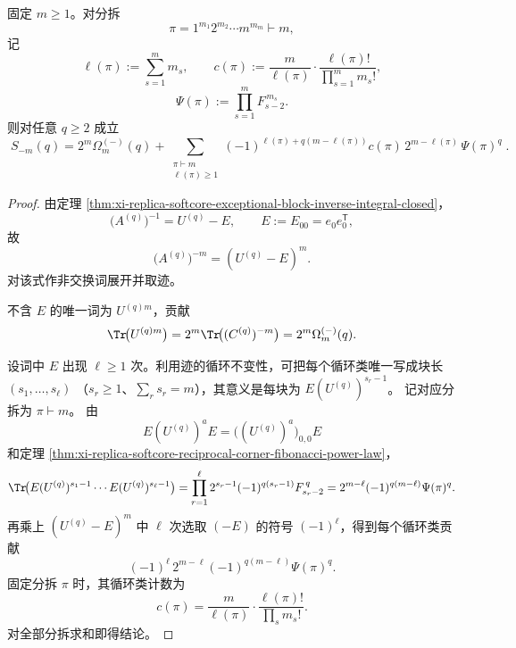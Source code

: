 \begin{theorem}\label{thm:xi-replica-softcore-reciprocal-moment-partition-closed-form}
固定 \(m\ge1\)。对分拆
\[
\pi=1^{m_1}2^{m_2}\cdots m^{m_m}\vdash m,
\]
记
\[
\ell(\pi):=\sum_{s=1}^{m}m_s,\qquad
c(\pi):=\frac{m}{\ell(\pi)}\cdot\frac{\ell(\pi)!}{\prod_{s=1}^{m}m_s!},
\]
\[
\Psi(\pi):=\prod_{s=1}^{m}F_{s-2}^{\,m_s}.
\]
则对任意 \(q\ge2\) 成立
\[
\boxed{\;
S_{-m}(q)
=2^m\Omega_m^{(-)}(q)
+\sum_{\substack{\pi\vdash m\\ \ell(\pi)\ge1}}
(-1)^{\ell(\pi)+q(m-\ell(\pi))}
c(\pi)\,2^{m-\ell(\pi)}\,\Psi(\pi)^q\; }.
\]
\end{theorem}
\begin{proof}
由定理 \ref{thm:xi-replica-softcore-exceptional-block-inverse-integral-closed}，
\[
\bigl(A^{(q)}\bigr)^{-1}=U^{(q)}-E,\qquad E:=E_{00}=e_0e_0^{\mathsf T},
\]
故
\[
\bigl(A^{(q)}\bigr)^{-m}=(U^{(q)}-E)^m.
\]
对该式作非交换词展开并取迹。

不含 \(E\) 的唯一词为 \(U^{(q)m}\)，贡献
\[
\Tr\!\bigl(U^{(q)m}\bigr)
=2^m\Tr\!\bigl((C^{(q)})^{-m}\bigr)
=2^m\Omega_m^{(-)}(q).
\]

设词中 \(E\) 出现 \(\ell\ge1\) 次。利用迹的循环不变性，可把每个循环类唯一写成块长
\(
(s_1,\dots,s_\ell)
\)
（\(s_r\ge1\)、\(\sum_r s_r=m\)），其意义是每块为 \(E(U^{(q)})^{s_r-1}\)。
记对应分拆为 \(\pi\vdash m\)。
由
\[
E(U^{(q)})^aE=\bigl((U^{(q)})^a\bigr)_{0,0}E
\]
和定理 \ref{thm:xi-replica-softcore-reciprocal-corner-fibonacci-power-law}，
\[
\Tr\!\bigl(E(U^{(q)})^{s_1-1}\cdots E(U^{(q)})^{s_\ell-1}\bigr)
=\prod_{r=1}^{\ell}2^{s_r-1}(-1)^{q(s_r-1)}F_{s_r-2}^{\,q}
=2^{m-\ell}(-1)^{q(m-\ell)}\Psi(\pi)^q.
\]
再乘上 \((U^{(q)}-E)^m\) 中 \(\ell\) 次选取 \((-E)\) 的符号 \((-1)^\ell\)，得到每个循环类贡献
\[
(-1)^\ell\,2^{m-\ell}(-1)^{q(m-\ell)}\Psi(\pi)^q.
\]
固定分拆 \(\pi\) 时，其循环类计数为
\[
c(\pi)=\frac{m}{\ell(\pi)}\cdot\frac{\ell(\pi)!}{\prod_s m_s!}.
\]
对全部分拆求和即得结论。
\end{proof}

